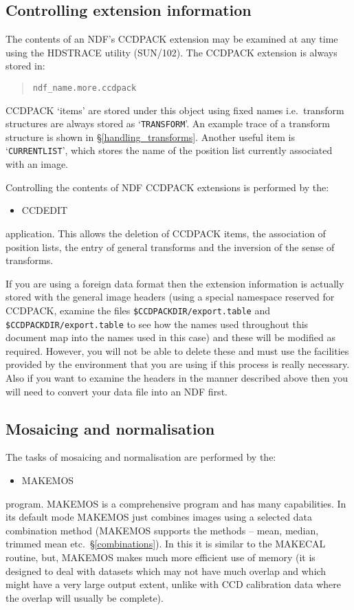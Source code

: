 \documentclass[twoside,11pt]{article}
\newcommand{\hyperref}[4]{#2\ref{#4}#3}
\newcommand{\htmlref}[2]{#1}
\newcommand{\xref}[3]{#1}
\renewcommand{\_}{\texttt{\symbol{95}}}
\newenvironment{myquote}{\begin{quote}\begin{small}}{\end{small}\end{quote}}
\newcommand{\text}[1]{{\small \tt #1}}
\newcommand{\routine}[1]{{\sc #1}}
\newcommand{\xroutine}[1]{\htmlref{{\sc #1}}{#1}}
\begin{document}
\subsection{Controlling extension information}
The contents of an NDF's CCDPACK extension may be examined at any time
using the \xref{HDSTRACE utility (SUN/102)}{sun102}{}. The CCDPACK extension
is always stored in:
\begin{myquote}
\begin{verbatim}
ndf_name.more.ccdpack
\end{verbatim}
\end{myquote}
CCDPACK `items' are stored under this object using fixed names i.e.\
transform structures are always stored as `\text{TRANSFORM}'. An example
trace of a transform structure is shown in
\hyperref{``handling transforms''}{\S}{}{handling_transforms}.  Another
useful item is `\text{CURRENT\_LIST}', which stores the name of the position
list currently associated with an image.

Controlling the contents of NDF CCDPACK extensions is performed by the:
\begin{itemize}
\item \xroutine{CCDEDIT}
\end{itemize}
application. This allows the deletion of CCDPACK items, the association
of position lists, the entry of general transforms and the inversion of
the sense of transforms.

If you are using a foreign data format then the extension information
is actually stored with the general image headers (using a special
namespace reserved for CCDPACK, examine the files
\text{\$CCDPACK\_DIR/export.table} and
\text{\$CCDPACK\_DIR/export.table} to see how the names used throughout
this document map into the names used in this case) and these will be
modified as required. However, you will not be able to delete these
and must use the facilities provided by the environment that you are
using if this process is really necessary. Also if you want to examine
the headers in the manner described above then you will need to
convert your data file into an NDF first.

\subsection{Mosaicing and normalisation}

The tasks of mosaicing and normalisation are performed by the:
\begin{itemize}
\item \xroutine{MAKEMOS}
\end{itemize}
program. \routine{MAKEMOS} is a comprehensive program and has many
capabilities. In its default mode \routine{MAKEMOS} just combines images using a
selected data combination method (\routine{MAKEMOS} supports the
methods -- mean, median, trimmed mean etc.\ \S\ref{combinations}).
In this it is similar to the \xroutine{MAKECAL} routine, but,
\routine{MAKEMOS} makes much more efficient use of
memory (it is designed to deal with datasets which may not have much
overlap and which might have a very large output extent, unlike with CCD
calibration data where the overlap will usually be complete).
\end{document}
